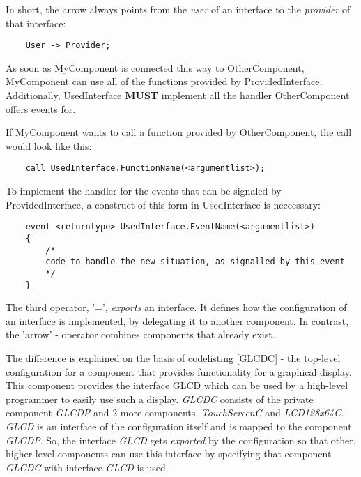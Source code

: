 In short, the arrow always points from the \textit{user} of an interface to the \textit{provider} of that interface:

\begin{lstlisting}
	User -> Provider;
\end{lstlisting}

As soon as MyComponent is connected this way to OtherComponent, MyComponent can use all of the functions provided by ProvidedInterface. Additionally, UsedInterface \textbf{MUST} implement all the handler OtherComponent offers events for. 

If MyComponent wants to call a function provided by OtherComponent, the call would look like this:

\begin{lstlisting}
	call UsedInterface.FunctionName(<argumentlist>);
\end{lstlisting}

To implement the handler for the events that can be signaled by ProvidedInterface, a construct of this form in UsedInterface is neccessary:

\begin{lstlisting}
	event <returntype> UsedInterface.EventName(<argumentlist>)
	{
		/*
		code to handle the new situation, as signalled by this event
		*/
	}
\end{lstlisting}

The third operator, '=', \textit{exports} an interface. It defines how the configuration of an interface is implemented, by delegating it to another component. In contrast, the 'arrow' - operator combines components that already exist.



The difference is explained on the basis of codelisting \ref{GLCDC} - the top-level configuration for a component that provides functionality for a graphical display. This component provides the interface GLCD which can be used by a high-level programmer to easily use such a display. \textit{GLCDC} consists of the private component \textit{GLCDP} and 2 more components, \textit{TouchScreenC} and \textit{LCD128x64C}. \textit{GLCD} is an interface of the configuration itself and is mapped to the component \textit{GLCDP}. So, the interface \textit{GLCD} gets \textit{exported} by the configuration so that other, higher-level components can use this interface by specifying that component \textit{GLCDC} with interface \textit{GLCD} is used.

